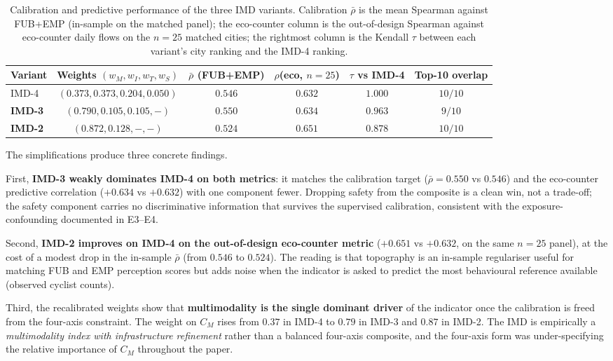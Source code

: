 \documentclass[11pt,a4paper]{article}
\begin{document}
\begin{table}[H]
\centering
\caption{Calibration and predictive performance of the three IMD
variants. Calibration $\bar\rho$ is the mean Spearman against
FUB+EMP (in-sample on the matched panel); the eco-counter column
is the out-of-design Spearman against eco-counter daily flows on
the $n = 25$ matched cities; the rightmost column is the Kendall
$\tau$ between each variant's city ranking and the IMD-4 ranking.}
\label{tab:imd-variants}
\small
\begin{tabular}{@{}lccccc@{}}
\toprule
Variant & Weights $(w_M, w_I, w_T, w_S)$ &
$\bar\rho$ (FUB+EMP) &
$\rho$(eco, $n = 25$) &
$\tau$ vs IMD-4 &
Top-10 overlap \\
\midrule
IMD-4 & $(0.373, 0.373, 0.204, 0.050)$ & $0.546$ & $0.632$ & $1.000$ & $10/10$ \\
\textbf{IMD-3} & $(0.790, 0.105, 0.105, -)$ &
   $\mathbf{0.550}$ & $\mathbf{0.634}$ & $0.963$ & $9/10$ \\
\textbf{IMD-2} & $(0.872, 0.128, -, -)$ &
   $0.524$ & $\mathbf{0.651}$ & $0.878$ & $10/10$ \\
\bottomrule
\end{tabular}
\end{table}

The simplifications produce three concrete findings.

First, \textbf{IMD-3 weakly dominates IMD-4 on both metrics}: it
matches the calibration target ($\bar\rho = 0.550$ vs $0.546$)
and the eco-counter predictive correlation ($+0.634$ vs $+0.632$)
with one component fewer. Dropping safety from the composite is
a clean win, not a trade-off; the safety component carries no
discriminative information that survives the supervised
calibration, consistent with the exposure-confounding documented
in E3--E4.

Second, \textbf{IMD-2 improves on IMD-4 on the out-of-design
eco-counter metric} ($+0.651$ vs $+0.632$, on the same $n = 25$
panel), at the cost of a modest drop in the in-sample
$\bar\rho$ (from $0.546$ to $0.524$). The reading is that
topography is an in-sample regulariser useful for matching FUB
and EMP perception scores but adds noise when the indicator is
asked to predict the most behavioural reference available
(observed cyclist counts).

Third, the recalibrated weights show that
\textbf{multimodality is the single dominant driver} of the
indicator once the calibration is freed from the four-axis
constraint. The weight on $C_M$ rises from $0.37$ in IMD-4 to
$0.79$ in IMD-3 and $0.87$ in IMD-2. The IMD is empirically a
\emph{multimodality index with infrastructure refinement} rather
than a balanced four-axis composite, and the four-axis form was
under-specifying the relative importance of $C_M$ throughout the
paper.
\end{document}
